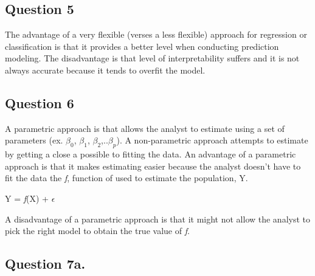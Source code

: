 \documentclass{article}
\begin{document}
\subsection*{Question 5}
The advantage of a very flexible (verses a less flexible) approach for regression or classification is that it provides a better
level when conducting prediction modeling. The disadvantage is that level of interpretability suffers and it is not always accurate because it tends to overfit the model.

\subsection*{Question 6}
A parametric approach is that allows the analyst to estimate using a set of parameters (ex. $\beta_{0}$, $\beta_{1}$,
$\beta_{2}$,..$\beta_{p}$). A non-parametric approach attempts to estimate by getting a close a possible to fitting the data. 
An advantage of a parametric approach is that it makes estimating easier because the analyst doesn't have to fit the data the \textit{f}, function of used to estimate the population, Y.  \newline
\begin{center}
Y = \textit{f}(X) + $\epsilon$ 
\end{center}
A disadvantage of a parametric approach is that it might not allow the analyst to pick the right model to obtain the true value of \textit{f}.

\subsection*{Question 7a.}
\end{document}

